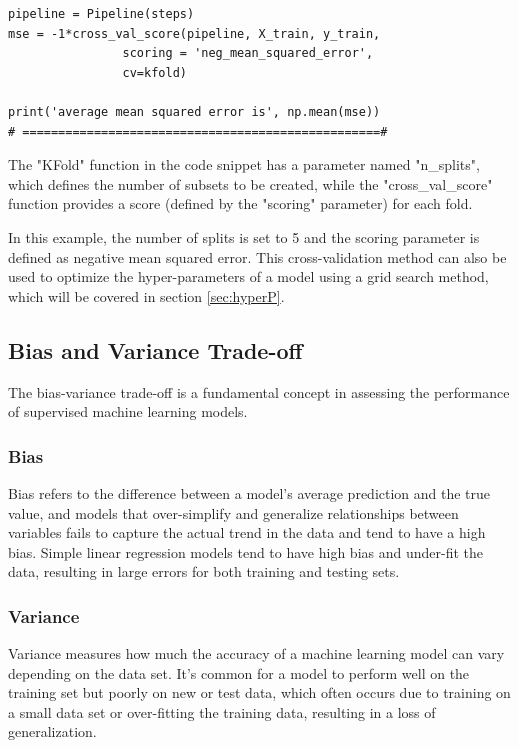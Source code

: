 {\begin{lstlisting}
pipeline = Pipeline(steps)
mse = -1*cross_val_score(pipeline, X_train, y_train,
                scoring = 'neg_mean_squared_error',
                cv=kfold)

print('average mean squared error is', np.mean(mse))
# ==================================================#
\end{lstlisting} The "KFold" function in the code snippet has a parameter named "n\_splits", which defines the number of subsets to be created, while the "cross\_val\_score" function provides a score (defined by the "scoring" parameter) for each fold. 

In this example, the number of splits is set to 5 and the scoring parameter is defined as negative mean squared error. This cross-validation method can also be used to optimize the hyper-parameters of a model using a grid search method, which will be covered in section \ref{sec:hyperP}.

\newpage
\subsection{Bias and Variance Trade-off}

The bias-variance trade-off is a fundamental concept in assessing the performance of supervised machine learning models.

\subsubsection{\textbf{Bias}}
Bias refers to the difference between a model's average prediction and the true value, and models that over-simplify and generalize relationships between variables fails to capture the actual trend in the data and tend to have a high bias. Simple linear regression models tend to have high bias and under-fit the data, resulting in large errors for both training and testing sets.

\subsubsection{\textbf{Variance}}
Variance measures how much the accuracy of a machine learning model can vary depending on the data set. It's common for a model to perform well on the training set but poorly on new or test data, which often occurs due to training on a small data set or over-fitting the training data, resulting in a loss of generalization.

}
